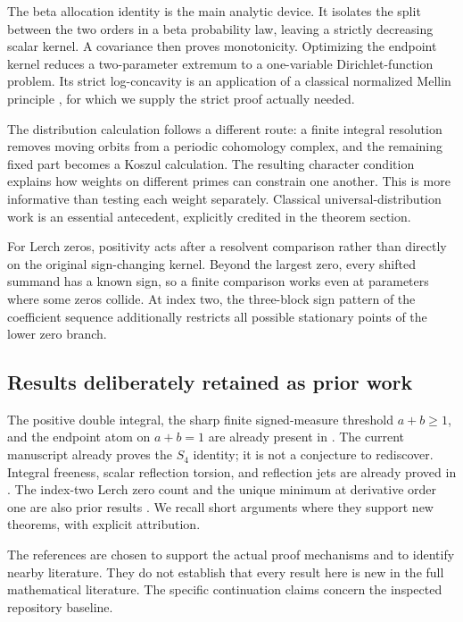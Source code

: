 The beta allocation identity is the main analytic device. It isolates
the split between the two orders in a beta probability law, leaving a
strictly decreasing scalar kernel. A covariance then proves
monotonicity. Optimizing the endpoint kernel reduces a two-parameter
extremum to a one-variable Dirichlet-function problem. Its strict
log-concavity is an application of a classical normalized Mellin
principle \cite{flm}, for which we supply the strict proof actually needed.

The distribution calculation follows a different route: a finite
integral resolution removes moving orbits from a periodic cohomology
complex, and the remaining fixed part becomes a Koszul calculation.
The resulting character condition explains how weights on different
primes can constrain one another. This is more informative than testing
each weight separately. Classical universal-distribution work is an
essential antecedent, explicitly credited in the theorem section.

For Lerch zeros, positivity acts after a resolvent comparison rather
than directly on the original sign-changing kernel. Beyond the largest
zero, every shifted summand has a known sign, so a finite comparison
works even at parameters where some zeros collide. At index two,
the three-block sign pattern of the coefficient sequence additionally
restricts all possible stationary points of the lower zero branch.

\subsection{Results deliberately retained as prior work}

The positive double integral, the sharp finite signed-measure threshold
$a+b\ge1$, and the endpoint atom on $a+b=1$ are already present in
\cite{realorder}. The current manuscript already proves the $S_4$
identity; it is not a conjecture to rediscover. Integral freeness,
scalar reflection torsion, and reflection jets are already proved in
\cite{integraljets}. The index-two Lerch zero count and the unique
minimum at derivative order one are also prior results
\cite{lershape:Boundary}. We recall short arguments where they support
new theorems, with explicit attribution.

The references are chosen to support the actual proof mechanisms and
to identify nearby literature. They do not establish that every result
here is new in the full mathematical literature. The specific
continuation claims concern the inspected repository baseline.
